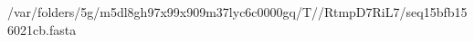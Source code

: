 \documentclass[10pt]{article}
\begin{document}
\begin{texshade}{/var/folders/5g/m5dl8gh97x99x909m37lyc6c0000gq/T//RtmpD7RiL7/seq15bfb156021cb.fasta}
\hidelogoscale
{}
\end{texshade}
\end{document}
